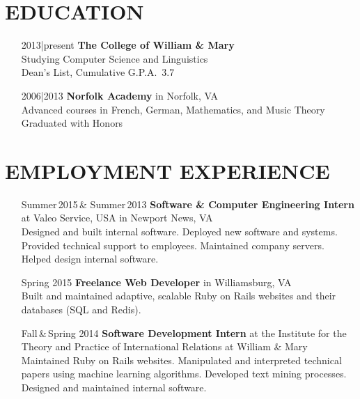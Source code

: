 \documentclass{res}     %
\begin{document}
\begin{resume}

\section{EDUCATION}          
\vspace{5mm}
\begin{itemize}[font=\itshape,align=parleft,labelwidth=3cm,leftmargin=2cm]
    \item[2013|present]
        \textbf{The College of William \& Mary}
        \\ Studying Computer Science and Linguistics %
        \\ Dean's List, Cumulative G.P.A.\ 3.7
    \item[2006|2013]
        \textbf{Norfolk Academy} in Norfolk, VA
        \\ Advanced courses in French, German, Mathematics, and Music Theory
        \\ Graduated with Honors
\end{itemize}

\section{EMPLOYMENT EXPERIENCE}
\vspace{5mm}
\begin{itemize}[font=\itshape,align=parleft,labelwidth=3cm,leftmargin=2cm]
    \item[Summer\,2015\,\& Summer\,2013]
        \textbf{Software \& Computer Engineering Intern}
        at Valeo Service, USA
        in Newport News, VA
        \vspace{1mm} \\
        Designed and built internal software.
        Deployed new software and systems.
        Provided technical support to employees.
        Maintained company servers.
        Helped design internal software.
    \item[Spring 2015]
        \textbf{Freelance Web Developer}
        in Williamsburg, VA
        \vspace{1mm} \\
        Built and maintained adaptive, scalable Ruby on Rails websites and their databases (SQL and Redis).
    \item[Fall\,\&\,Spring 2014]
        \textbf{Software Development Intern}
        at the Institute for the Theory and Practice of International Relations
        at William \& Mary
        \vspace{1mm} \\
        Maintained Ruby on Rails websites.
        Manipulated and interpreted technical papers using machine learning algorithms.
        Developed text mining processes.
        Designed and maintained internal software.
\end{itemize}


\end{resume}
\end{document}
